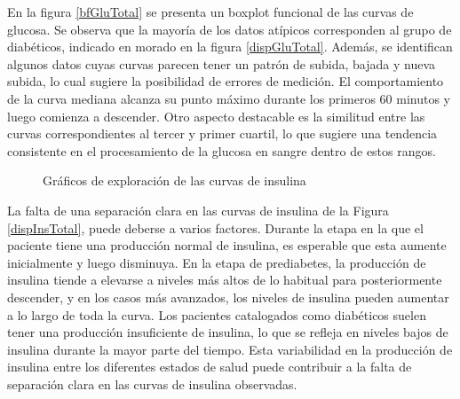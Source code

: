 En la figura \ref{bfGluTotal} se presenta un boxplot funcional de las curvas de glucosa. Se observa que la mayoría de los datos atípicos corresponden al grupo de diabéticos, indicado en morado en la figura \ref{dispGluTotal}. Además, se identifican algunos datos cuyas curvas parecen tener un patrón de subida, bajada y nueva subida, lo cual sugiere la posibilidad de errores de medición. El comportamiento de la curva mediana alcanza su punto máximo durante los primeros 60 minutos y luego comienza a descender. Otro aspecto destacable es la similitud entre las curvas correspondientes al tercer y primer cuartil, lo que sugiere una tendencia consistente en el procesamiento de la glucosa en sangre dentro de estos rangos.


\begin{figure}[H]
 \centering
    \caption{Gráficos de exploración de las curvas de insulina}
    \label{fig:insulina}
\end{figure}

La falta de una separación clara en las curvas de insulina de la Figura \ref{dispInsTotal}, puede deberse a varios factores. Durante la etapa en la que el paciente tiene una producción normal de insulina, es esperable que esta aumente inicialmente y luego disminuya. En la etapa de prediabetes, la producción de insulina tiende a elevarse a niveles más altos de lo habitual para posteriormente descender, y en los casos más avanzados, los niveles de insulina pueden aumentar a lo largo de toda la curva. Los pacientes catalogados como diabéticos suelen tener una producción insuficiente de insulina, lo que se refleja en niveles bajos de insulina durante la mayor parte del tiempo. Esta variabilidad en la producción de insulina entre los diferentes estados de salud puede contribuir a la falta de separación clara en las curvas de insulina observadas.


